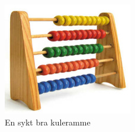 \documentclass[a4paper]{article}
\begin{document}

\begin{figure}[h]
    \centering
    \includegraphics[width=0.5\textwidth]{kuleramme}
    \caption{En sykt bra kuleramme}
    \label{fig:kuleramme}
\end{figure}
\end{document}
